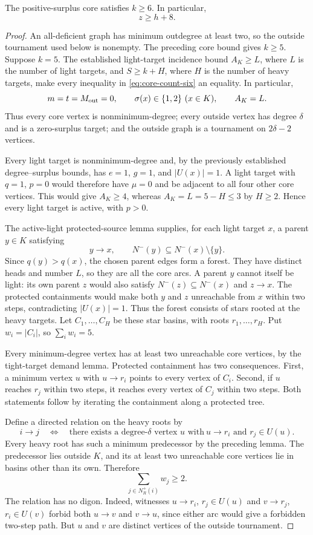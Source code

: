 \begin{theorem}\label{thm:core-six}
The positive-surplus core satisfies $k\ge6$. In particular,
\[
 {z\ge h+8}.
\]
\end{theorem}
\begin{proof}
An all-deficient graph has minimum outdegree at least two, so the outside tournament used below is nonempty. The preceding core bound gives $k\ge5$. Suppose $k=5$.
The established light-target incidence bound $A_K\ge L$, where
$L$ is the number of light targets, and $S\ge k+H$, where $H$
is the number of heavy targets, make every inequality in
\eqref{eq:core-count-six} an equality. In particular,
\[
 m=t=M_{\rm out}=0,\qquad
 \sigma(x)\in\{1,2\}\ (x\in K),\qquad A_K=L.
\]
Thus every core vertex is nonminimum-degree; every outside vertex
has degree $\delta$ and is a zero-surplus target; and the outside
graph is a tournament on $2\delta-2$ vertices.

 Every light target is nonminimum-degree and, by the previously
 established degree--surplus bounds, has $e=1$, $g=1$, and
 $|U(x)|=1$. A light target with $q=1$, $p=0$ would therefore
 have $\mu=0$ and be adjacent to all four other core vertices.
 This would give $A_K\ge4$, whereas $A_K=L=5-H\le3$ by $H\ge2$.
 Hence every light target is active, with $p>0$.

 The active-light protected-source lemma supplies, for each
 light target $x$, a parent $y\in K$ satisfying
 \[
 y\to x,\qquad N^-(y)\subseteq N^-(x)\setminus\{y\}.
 \]
 Since $q(y)>q(x)$, the chosen parent edges form a forest.
 They have distinct heads and number $L$, so they are all the
 core arcs. A parent $y$ cannot itself be light: its own parent
 $z$ would also satisfy $N^-(z)\subseteq N^-(x)$ and $z\to x$.
 The protected containments would make both $y$ and $z$
 unreachable from $x$ within two steps, contradicting $|U(x)|=1$.
 Thus the forest consists of stars rooted at the heavy targets.
 Let $C_1,\ldots,C_H$ be these star basins, with roots
 $r_1,\ldots,r_H$.
 Put $w_i=|C_i|$, so $\sum_iw_i=5$.

Every minimum-degree vertex has at least two unreachable core
vertices, by the tight-target demand lemma. Protected containment
has two consequences. First, a minimum vertex $u$ with $u\to r_i$
points to every vertex of $C_i$. Second, if $u$ reaches $r_j$
within two steps, it reaches every vertex of $C_j$ within two
steps. Both statements follow by iterating the containment along
a protected tree.

Define a directed relation on the heavy roots by
\[
 i\to j\quad\Longleftrightarrow\quad
 \text{there exists a degree-$\delta$ vertex $u$ with}
 \ u\to r_i\text{ and }r_j\in U(u).
\]
Every heavy root has such a minimum predecessor by the preceding
lemma. The predecessor lies outside $K$, and its at least two
unreachable core vertices lie in basins other than its own.
Therefore
\[
 \sum_{j\in N_R^+(i)}w_j\ge2.
\]
The relation has no digon. Indeed, witnesses $u\to r_i$,
$r_j\in U(u)$ and $v\to r_j$, $r_i\in U(v)$ forbid both
$u\to v$ and $v\to u$, since either arc would give a forbidden
two-step path. But $u$ and $v$ are distinct vertices of the
outside tournament.


\end{proof}
